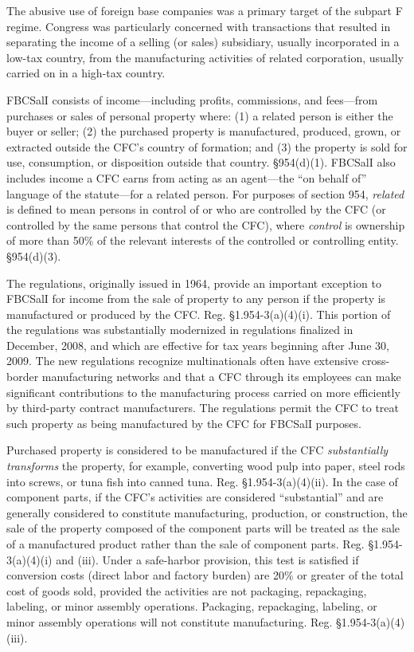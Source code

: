 		The abusive use of foreign base companies was a primary target of the subpart F regime.  Congress was particularly concerned with transactions that resulted in separating the income of a selling (or sales) subsidiary, usually incorporated in a low-tax country, from the manufacturing activities of related corporation, usually carried on in a high-tax country.  
		
		FBCSalI consists of income---including profits, commissions, and fees---from purchases or sales of personal property where:  (1) a related person is either the buyer or seller; (2) the purchased property is manufactured, produced, grown, or extracted outside the CFC's country of formation; and (3) the property is sold for use, consumption, or disposition outside that country.  \S 954(d)(1).  FBCSalI also includes income a CFC earns from acting as an agent---the ``on behalf of'' language of the statute---for a related person.  For purposes of section 954, \emph{related} is defined to mean persons in control of or who are controlled by the CFC (or controlled by the same persons that control the CFC), where \emph{control} is ownership of more than 50\% of the relevant interests of the controlled or controlling entity.  \S 954(d)(3).    
		
		The regulations, originally issued in 1964, provide an important exception to FBCSalI for income from the sale of property to any person if the property is manufactured or produced by the CFC.  Reg. \S 1.954-3(a)(4)(i).  This portion of the regulations was substantially modernized in regulations finalized in December, 2008, and which are effective for tax years beginning after June 30, 2009.  The new regulations recognize multinationals often have extensive cross-border manufacturing networks and that a CFC through its employees can make significant contributions to the manufacturing process carried on more efficiently by third-party contract manufacturers.  The regulations permit the CFC to treat such property as being manufactured by the CFC for FBCSalI purposes.       
		
		Purchased property is considered to be manufactured if the CFC \emph{substantially transforms} the property, for example, converting wood pulp into paper, steel rods into screws, or tuna fish into canned tuna.  Reg. \S 1.954-3(a)(4)(ii).  In the case of component parts, if the CFC's activities are considered ``substantial'' and are generally considered to constitute manufacturing, production, or construction, the sale of the property composed of the component parts will be treated as the sale of a manufactured product rather than the sale of component parts. Reg. \S 1.954-3(a)(4)(i) and (iii).  Under a safe-harbor provision, this test is satisfied if conversion costs (direct labor and factory burden) are 20\% or greater of the total cost of goods sold, provided the activities are not packaging, repackaging, labeling, or minor assembly operations.  Packaging, repackaging, labeling, or minor assembly operations will not constitute manufacturing.  Reg. \S1.954-3(a)(4)(iii).
		
